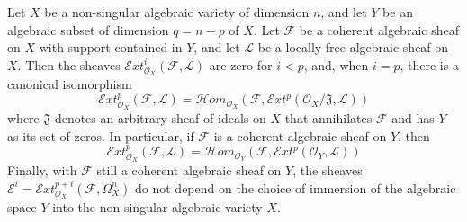 \begin{proposition}\label{fga1-proposition-5}
  Let $X$ be a non-singular algebraic variety of dimension $n$, and let $Y$ be an algebraic subset of dimension $q=n-p$ of $X$.
  Let $\mathcal{F}$ be a coherent algebraic sheaf on $X$ with support contained in $Y$, and let $\mathcal{L}$ be a locally-free algebraic sheaf on $X$.
  Then the sheaves $\mathcal{E}xt_{\mathcal{O}_X}^i(\mathcal{F},\mathcal{L})$ are zero for $i<p$, and, when $i=p$, there is a canonical isomorphism
  \begin{equation}\tag{3.7}\label{fga1-equation-3.7}
    \mathcal{E}xt_{\mathcal{O}_X}^p(\mathcal{F},\mathcal{L})
    = \mathcal{H}om_{\mathcal{O}_X}(\mathcal{F},\mathcal{E}xt^p(\mathcal{O}_X/\mathfrak{J},\mathcal{L}))
  \end{equation}
  where $\mathfrak{J}$ denotes an arbitrary sheaf of ideals on $X$ that annihilates $\mathcal{F}$ and has $Y$ as its set of zeros.
  In particular, if $\mathcal{F}$ is a coherent algebraic sheaf on $Y$, then
  \begin{equation}\tag{3.7 bis}\label{fga1-equation-3.7bis}
    \mathcal{E}xt_{\mathcal{O}_X}^p(\mathcal{F},\mathcal{L})
    = \mathcal{H}om_{\mathcal{O}_Y}(\mathcal{F},\mathcal{E}xt^p(\mathcal{O}_Y,\mathcal{L}))
  \end{equation}
  Finally, with $\mathcal{F}$ still a coherent algebraic sheaf on $Y$, the sheaves $\mathcal{E}^i=\mathcal{E}xt_{\mathcal{O}_X}^{p+i}(\mathcal{F},\Omega_X^n)$ do not depend on the choice of immersion of the algebraic space $Y$ into the non-singular algebraic variety $X$.
\end{proposition}

